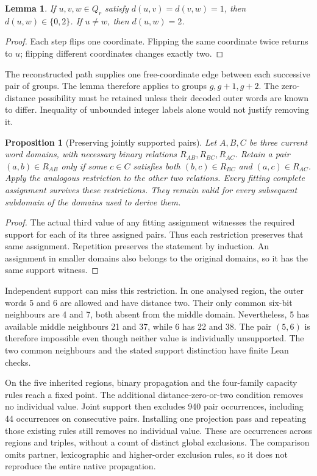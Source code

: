 \documentclass[11pt,a4paper]{article}
\newtheorem{proposition}[theorem]{Proposition}
\newtheorem{lemma}[theorem]{Lemma}
\theoremstyle{definition}
\theoremstyle{remark}
\begin{document}
\begin{lemma}\label{lem:two-step216}
If $u,v,w\in Q_r$ satisfy $d(u,v)=d(v,w)=1$, then
$d(u,w)\in\{0,2\}$. If $u\ne w$, then $d(u,w)=2$.
\end{lemma}
\begin{proof}
Each step flips one coordinate. Flipping the same coordinate twice
returns to $u$; flipping different coordinates changes exactly two.
\end{proof}

The reconstructed path supplies one free-coordinate edge between each
successive pair of groups. The lemma therefore applies to groups
$g,g+1,g+2$. The zero-distance possibility must be retained unless
their decoded outer words are known to differ. Inequality of unbounded
integer labels alone would not justify removing it.

\begin{proposition}[Preserving jointly supported pairs]\label{prop:joint216}
Let $A,B,C$ be three current word domains, with necessary binary
relations $R_{AB},R_{BC},R_{AC}$. Retain a pair $(a,b)\in R_{AB}$
only if some $c\in C$ satisfies both $(b,c)\in R_{BC}$ and
$(a,c)\in R_{AC}$. Apply the analogous restriction to the other
two relations. Every fitting complete assignment survives these
restrictions. They remain valid for every subsequent subdomain of
the domains used to derive them.
\end{proposition}
\begin{proof}
The actual third value of any fitting assignment witnesses the
required support for each of its three assigned pairs. Thus each
restriction preserves that same assignment. Repetition preserves
the statement by induction. An assignment in smaller domains also
belongs to the original domains, so it has the same support witness.
\end{proof}

Independent support can miss this restriction. In one analysed region,
the outer words 5 and 6 are allowed and have distance two. Their only
common six-bit neighbours are 4 and 7, both absent from the middle
domain. Nevertheless, 5 has available middle neighbours 21 and 37,
while 6 has 22 and 38. The pair $(5,6)$ is therefore impossible even
though neither value is individually unsupported. The two common
neighbours and the stated support distinction have finite Lean checks.

On the five inherited regions, binary propagation and the four-family
capacity rules reach a fixed point. The additional distance-zero-or-two
condition removes no individual value. Joint support then excludes
940 pair occurrences, including 44 occurrences on consecutive pairs.
Installing one projection pass and repeating those existing rules
still removes no individual value. These are occurrences across
regions and triples, without a count of distinct global exclusions.
The comparison omits partner, lexicographic and higher-order exclusion
rules, so it does not reproduce the entire native propagation.
\end{document}
